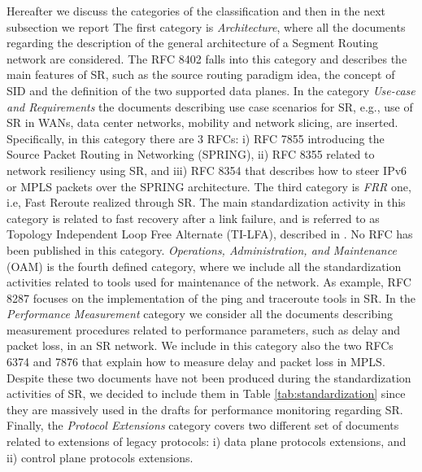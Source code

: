 Hereafter we discuss the categories of the classification and then in the next subsection we report 
The first category is \textit{Architecture}, where all the documents regarding the description of the general architecture of a Segment Routing network are considered. The RFC 8402 \cite{rfc8402} falls into this category and describes the main features of SR, such as the source routing paradigm idea, the concept of SID and the definition of the two supported data planes.
In the category \textit{Use-case and Requirements} the documents describing use case scenarios for SR, e.g., use of SR in WANs, data center networks, mobility and network slicing, are inserted. Specifically, in this category there are 3 RFCs: i) RFC 7855 \cite{rfc7855} introducing the Source Packet Routing in Networking (SPRING), ii) RFC 8355 \cite{rfc8355} related to network resiliency using SR, and iii) RFC 8354 \cite{rfc8354} that describes how to steer IPv6 or MPLS packets over the SPRING architecture.
The third category is \textit{FRR} one, i.e, Fast Reroute realized through SR. The main standardization activity in this category is related to fast recovery after a link failure, and is referred to as Topology Independent Loop Free Alternate (TI-LFA), described in \cite{id-segment-routing-ti-lfa}. No RFC has been published in this category.
\textit{Operations, Administration, and Maintenance} (OAM) is the fourth defined category, where we include all the standardization activities related to tools used for maintenance of the network. As example, RFC 8287 \cite{rfc8287} focuses on the implementation of the ping and traceroute tools in SR.
In the \textit{Performance Measurement} category we consider all the documents describing measurement procedures related to performance parameters, such as delay and packet loss, in an SR network. We include in this category also the two RFCs 6374 \cite{rfc6374} and 7876 \cite{rfc7876} that explain how to measure delay and packet loss in MPLS. Despite these two documents have not been produced during the standardization activities of SR, we decided to include them in Table \ref{tab:standardization} since they are massively used in the drafts for performance monitoring regarding SR.
Finally, the \textit{Protocol Extensions} category covers two different set of documents related to extensions of legacy protocols: i) data plane protocols extensions, and ii) control plane protocols extensions.
